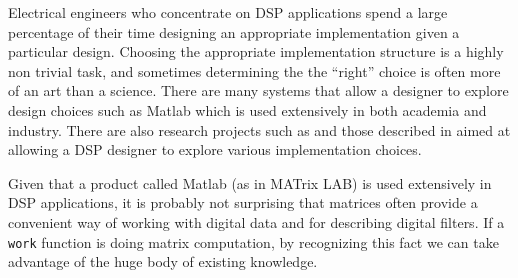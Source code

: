 Electrical engineers who concentrate on DSP applications spend a large percentage of their 
time designing an appropriate implementation given a particular design. Choosing
the appropriate implementation structure is a highly non trivial task, and sometimes determining the 
the ``right'' choice is often more of an art than a science. There are many systems that allow a
designer to explore design choices such as Matlab\cite{matlab} which is used extensively in
both academia and industry.  There are also research projects such as \cite{covell-ade} 
and those described in \cite{oppenheim-symbolic} aimed at allowing a DSP designer to explore
various implementation choices.

Given that a product called Matlab (as in  MATrix LAB) is used extensively
in DSP applications, it is probably not surprising that matrices often provide 
a convenient way of working with digital data and for describing digital filters. 
If a {\tt work} function is doing matrix computation, by recognizing this fact
we can take advantage of the huge body of existing knowledge.

